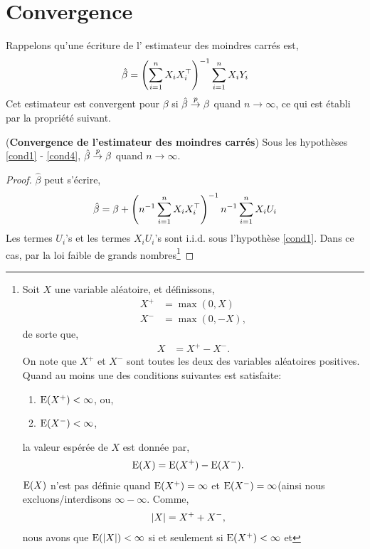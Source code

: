 \section{Convergence}
Rappelons qu'une écriture de l' estimateur des moindres carrés est,
\begin{align*}
\hat{\beta}= \left(\sum_{i=1}^n X_iX_i^\top\right)^{-1}\sum_{i=1}^n X_iY_i
\end{align*}
Cet estimateur est convergent pour $\beta$ si $\hat{\beta}\overset{p}{\rightarrow} \beta$ quand $n\to \infty$, ce qui est établi par la propriété suivant.
\begin{propriete}(\textbf{Convergence de l'estimateur des moindres carrés})
Sous les hypothèses \ref{cond1} - \ref{cond4}, $\hat{\beta}\overset{p}{\rightarrow} \beta$ quand $n\to \infty$.
\end{propriete}
\begin{proof}
$\hat{\beta}$ peut s'écrire,
\begin{align}
\hat{\beta}= \beta +  \left(n^{-1}\sum_{i=1}^n X_iX_i^\top\right)^{-1}n^{-1}\sum_{i=1}^n X_iU_i
\label{eq1}
\end{align}
Les termes $U_i$'s et les termes $X_iU_i$'s sont i.i.d. sous l'hypothèse \ref{cond1}. 
Dans ce cas, par la loi faible de grands nombres\footnote{
Soit $X$ une variable aléatoire, et définissons, 
\begin{align*}
    X^{+} &=\max(0, X)\\ 
    X^{-} &=\max(0, -X),
\end{align*}
de sorte que, 
\begin{align*} 
    X &= X^{+} - X^{-}.
\end{align*}
On note que $X^{+}$ et $X^{-}$ sont toutes les deux des variables aléatoires positives. 
Quand au moins une des conditions suivantes est satisfaite: 
\begin{enumerate}[label = (\roman*)]
    \item $\operatorname{E}(X^{+}) < \infty$, ou,
    \item $\operatorname{E}(X^{-}) < \infty$,
\end{enumerate}
la valeur espérée de $X$ est donnée par, 
\begin{align*} 
    \operatorname{E}(X) &= \operatorname{E}(X^{+}) - \operatorname{E}(X^{-}).
\end{align*}
$\operatorname{E}(X)$ n'est pas définie quand  $\operatorname{E}(X^{+}) = \infty$ et $\operatorname{E}(X^{-})=\infty$(ainsi nous excluons/interdisons 
$\infty - \infty$. Comme, 
\begin{align*} 
    \left\vert {X} \right\vert &= X^{+}+ X^{-},
\end{align*}
nous avons que $\operatorname{E}(\left\vert {X} \right\vert)< \infty$ si et seulement si $\operatorname{E}(X^{+}) <\infty$ et
}
\end{proof}
